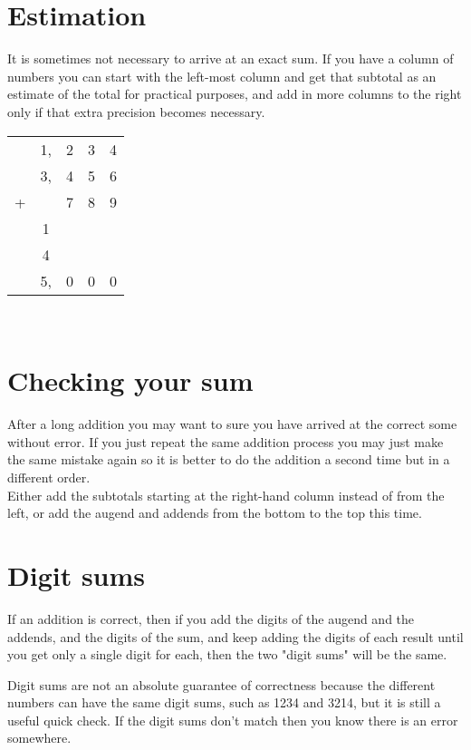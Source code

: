 \documentclass{article}
\begin{document}
\newpage

\section{Estimation}
It is sometimes not necessary to arrive at an exact sum. If you have a column of numbers you can start with the left-most column and get that subtotal as an estimate of the total for practical purposes, and add in more columns to the right only if that extra precision becomes necessary.

\begin{center}
\begin{tabular}{c@{\,}c@{\,}c@{\,}c@{\,}c}
	&1,&2&3&4\\
	&3,&4&5&6\\
	+ & &7&8&9\\
	\hline
	& 1& &&\\
	& 4& & &\\
	\hline
	&5,&0&0&0\\
	\hline
	\hline
\end{tabular}\\
\end{center}

\newpage

\section{Checking your sum}
After a long addition you may want to sure you have arrived at the correct some without error. If you just repeat the same addition process you may just make the same mistake again so it is better to do the addition a second time but in a different order.\\

Either add the subtotals starting at the right-hand column instead of from the left, or add the augend and addends from the bottom to the top this time.

\newpage

\section{Digit sums}
If an addition is correct, then if you add the digits of the augend and the addends, and the digits of the sum, and keep adding the digits of each result until you get only a single digit for each, then the two "digit sums" will be the same.

Digit sums are not an absolute guarantee of correctness because the different numbers can have the same digit sums, such as 1234 and 3214, but it is still a useful quick check. If the digit sums don't match then you know there is an error somewhere.
\end{document}
